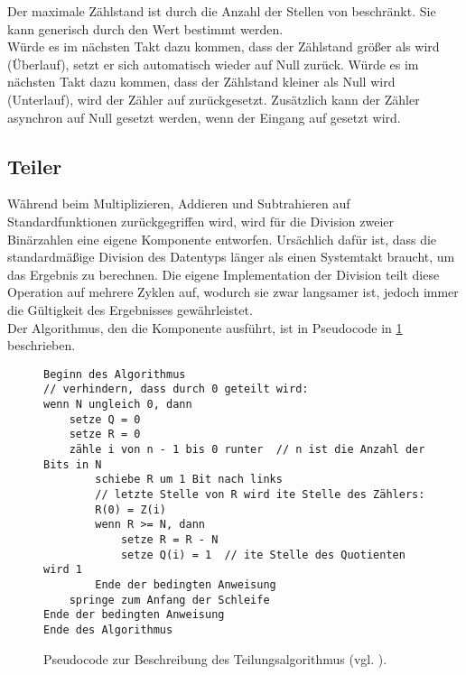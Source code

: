Der maximale Zählstand ist durch die Anzahl der Stellen von  beschränkt. Sie kann generisch durch den Wert  bestimmt werden. \\
Würde es im nächsten Takt dazu kommen, dass der Zählstand größer als  wird (Überlauf), setzt er sich automatisch wieder auf Null zurück.
Würde es im nächsten Takt dazu kommen, dass der Zählstand kleiner als Null wird (Unterlauf), wird der Zähler auf  zurückgesetzt.
Zusätzlich kann der Zähler asynchron auf Null gesetzt werden, wenn der Eingang  auf  gesetzt wird.


\subsection{Teiler} \label{Comp:Arith:Division}

Während beim Multiplizieren, Addieren und Subtrahieren auf Standardfunktionen zurückgegriffen wird, wird für die Division zweier Binärzahlen eine eigene Komponente entworfen.
Ursächlich dafür ist, dass die standardmäßige Division des  Datentyps länger als einen Systemtakt braucht, um das Ergebnis zu berechnen.
Die eigene Implementation der Division teilt diese Operation auf mehrere Zyklen auf, wodurch sie zwar langsamer ist, jedoch immer die Gültigkeit des Ergebnisses gewährleistet.\\
Der Algorithmus, den die Komponente ausführt, ist in Pseudocode in \cref{Comp:Arith:Division:Pseudo} beschrieben.

\begin{figure}[h]
\begin{verbatim}
Beginn des Algorithmus
// verhindern, dass durch 0 geteilt wird:
wenn N ungleich 0, dann
    setze Q = 0
    setze R = 0
    zähle i von n - 1 bis 0 runter  // n ist die Anzahl der Bits in N
        schiebe R um 1 Bit nach links
        // letzte Stelle von R wird ite Stelle des Zählers:
        R(0) = Z(i)                    
        wenn R >= N, dann               
            setze R = R - N
            setze Q(i) = 1  // ite Stelle des Quotienten wird 1 
        Ende der bedingten Anweisung
    springe zum Anfang der Schleife
Ende der bedingten Anweisung
Ende des Algorithmus
\end{verbatim}
  \caption{Pseudocode zur Beschreibung des Teilungsalgorithmus (vgl. \cite{wikipedia2022}).} \label{Comp:Arith:Division:Pseudo}
\end{figure}

